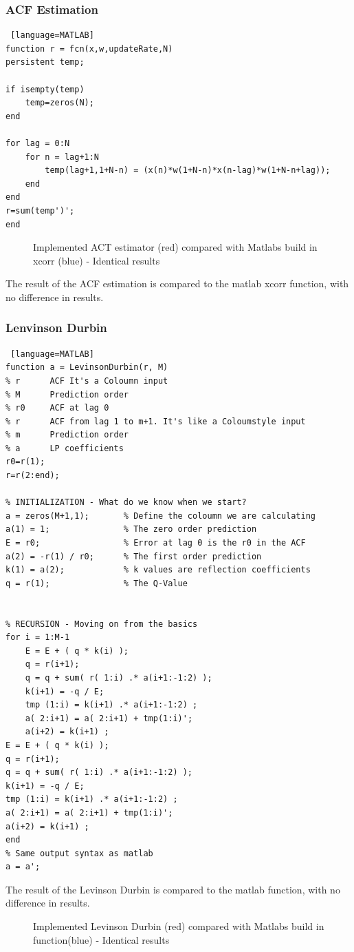 \subsubsection{ACF Estimation}
\begin{lstlisting} [language=MATLAB]
function r = fcn(x,w,updateRate,N)
persistent temp;

if isempty(temp)
	temp=zeros(N);
end

for lag = 0:N
	for n = lag+1:N
		temp(lag+1,1+N-n) = (x(n)*w(1+N-n)*x(n-lag)*w(1+N-n+lag));
	end
end
r=sum(temp')';
end
\end{lstlisting}

\begin{figure}[H]
	\centering
	
	\caption{Implemented ACT estimator (red) compared with Matlabs build in xcorr (blue) - Identical results}
	\label{fig:ACFTest}
\end{figure}
The result of the ACF estimation is compared to the matlab xcorr function, with no difference in results.   
\subsubsection{Lenvinson Durbin}
\begin{lstlisting} [language=MATLAB]
function a = LevinsonDurbin(r, M)
% r      ACF It's a Coloumn input
% M      Prediction order
% r0     ACF at lag 0
% r      ACF from lag 1 to m+1. It's like a Coloumstyle input
% m      Prediction order
% a      LP coefficients
r0=r(1);
r=r(2:end);

% INITIALIZATION - What do we know when we start?
a = zeros(M+1,1);       % Define the coloumn we are calculating
a(1) = 1;               % The zero order prediction
E = r0;                 % Error at lag 0 is the r0 in the ACF
a(2) = -r(1) / r0;      % The first order prediction
k(1) = a(2);            % k values are reflection coefficients
q = r(1);               % The Q-Value


% RECURSION - Moving on from the basics
for i = 1:M-1
	E = E + ( q * k(i) );                   
	q = r(i+1);
	q = q + sum( r( 1:i) .* a(i+1:-1:2) );
	k(i+1) = -q / E;
	tmp (1:i) = k(i+1) .* a(i+1:-1:2) ;
	a( 2:i+1) = a( 2:i+1) + tmp(1:i)';
	a(i+2) = k(i+1) ;
E = E + ( q * k(i) );                   
q = r(i+1);
q = q + sum( r( 1:i) .* a(i+1:-1:2) );
k(i+1) = -q / E;
tmp (1:i) = k(i+1) .* a(i+1:-1:2) ;
a( 2:i+1) = a( 2:i+1) + tmp(1:i)';
a(i+2) = k(i+1) ;
end
% Same output syntax as matlab
a = a';
\end{lstlisting}
The result of the Levinson Durbin is compared to the matlab function, with no difference in results.   
\begin{figure}[H]
	\centering
	
	\caption{Implemented Levinson Durbin (red) compared with Matlabs build in function(blue) - Identical results}
	\label{fig:LDTest}
\end{figure}


